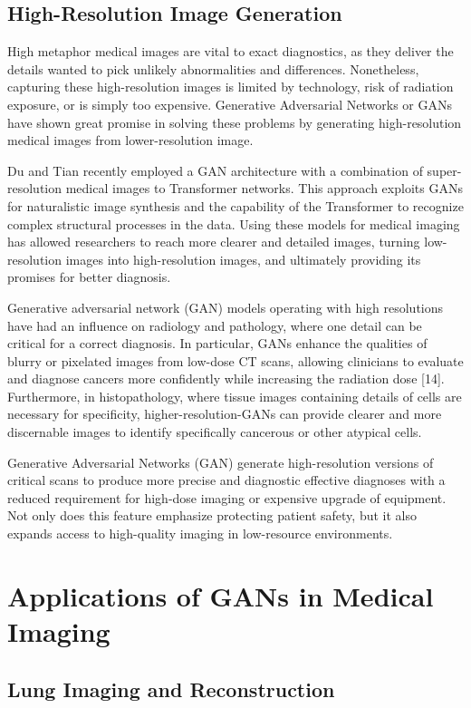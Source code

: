 \documentclass[12pt]{article}
\begin{document}
\subsection{High-Resolution Image Generation}

High metaphor medical images are vital to exact diagnostics, as they deliver the details wanted to pick unlikely abnormalities and differences. Nonetheless, capturing these high-resolution images is limited by technology, risk of radiation exposure, or is simply too expensive. Generative Adversarial Networks or GANs have shown great promise in solving these problems by generating high-resolution medical images from lower-resolution image.

Du and Tian \cite{Du2024} recently employed a GAN architecture with a combination of super-resolution medical images to Transformer networks. This approach exploits GANs for naturalistic image synthesis and the capability of the Transformer to recognize complex structural processes in the data. Using these models for medical imaging has allowed researchers to reach more clearer and detailed images, turning low-resolution images into high-resolution images, and ultimately providing its promises for better diagnosis.

Generative adversarial network (GAN) models operating with high resolutions have had an influence on radiology and pathology, where one detail can be critical for a correct diagnosis. In particular, GANs enhance the qualities of blurry or pixelated images from low-dose CT scans, allowing clinicians to evaluate and diagnose cancers more confidently while increasing the radiation dose [14]. Furthermore, in histopathology, where tissue images containing details of cells are necessary for specificity, higher-resolution-GANs can provide clearer and more discernable images to identify specifically cancerous or other atypical cells.

Generative Adversarial Networks (GAN) generate high-resolution versions of critical scans to produce more precise and diagnostic effective diagnoses with a reduced requirement for high-dose imaging or expensive upgrade of equipment. Not only does this feature emphasize protecting patient safety, but it also expands access to high-quality imaging in low-resource environments.

\section{Applications of GANs in Medical Imaging}
\subsection{Lung Imaging and Reconstruction}
\end{document}
